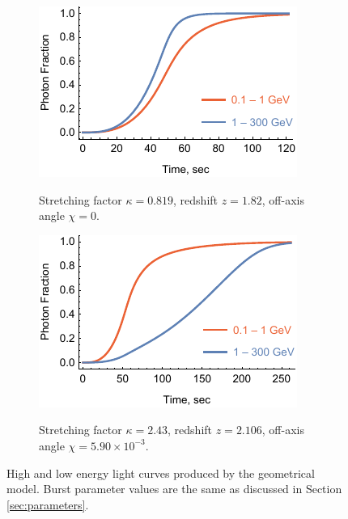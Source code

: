 \documentclass{article}
\begin{document}
	\begin{figure}
		\centering
		\hspace*{\fill}
		\begin{subfigure}{0.45\textwidth}
			\includegraphics[width=\textwidth]{sampleLightCurveLogNegative}
			\label{fig:sampleLightCurveLogNegative}
			\caption{Stretching factor $\kappa = 0.819$, redshift $z = 1.82$, off-axis angle $\chi = 0$.}
		\end{subfigure}
		\hfill
		\begin{subfigure}{0.45\textwidth}
			\includegraphics[width=\textwidth]{sampleLightCurveLogPositive}
			\label{fig:sampleLightCurveLogPosivie}
			\caption{Stretching factor $\kappa = 2.43$, redshift $z = 2.106$, off-axis angle $\chi = 5.90 \times 10^{-3}$.}
		\end{subfigure}
		\hspace*{\fill}
		\caption{
			High and low energy light curves produced by the geometrical model.
			Burst parameter values are the same as discussed in Section \ref{sec:parameters}.
		}
		\label{fig:sampleLightCurves}
	\end{figure}
\end{document}
